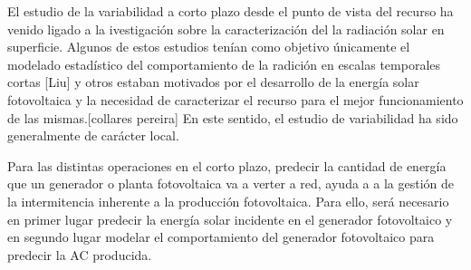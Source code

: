 El estudio de la variabilidad a corto plazo desde el punto de vista del recurso ha venido ligado a la ivestigación sobre la caracterización del la radiación solar en superficie. Algunos de estos estudios tenían como objetivo únicamente el modelado estadístico del comportamiento de la radición en escalas temporales cortas [Liu] y otros estaban motivados por el desarrollo de la energía solar fotovoltaica y la necesidad de caracterizar el recurso para el mejor funcionamiento de las mismas.[collares pereira] En este sentido, el estudio de variabilidad ha sido generalmente de carácter local.

{\color{red}Para las distintas operaciones en el corto plazo, predecir la cantidad de energía que un generador o planta fotovoltaica va a verter a red, ayuda a a la gestión de la intermitencia inherente a la producción fotovoltaica. Para ello, será necesario en primer lugar predecir la energía solar incidente en el generador fotovoltaico y en segundo lugar modelar el comportamiento del generador fotovoltaico para predecir la AC producida.}
 



